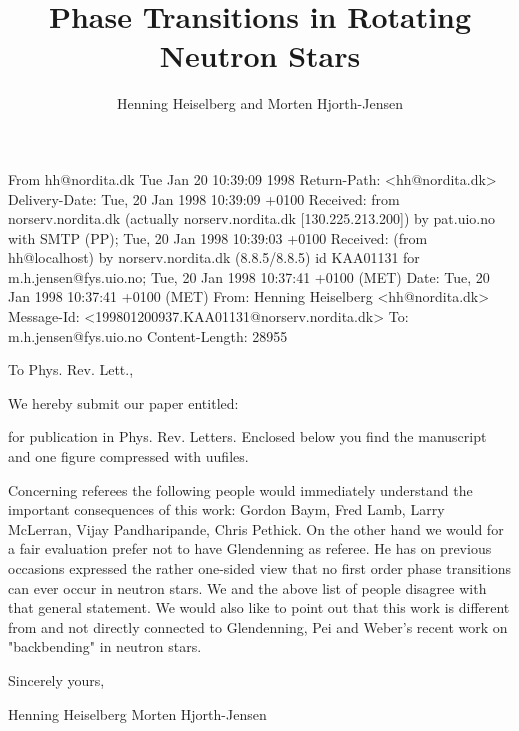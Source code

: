 From hh@nordita.dk Tue Jan 20 10:39:09 1998
Return-Path: <hh@nordita.dk>
Delivery-Date: Tue, 20 Jan 1998 10:39:09 +0100
Received: from norserv.nordita.dk (actually norserv.nordita.dk [130.225.213.200]) 
          by pat.uio.no with SMTP (PP); Tue, 20 Jan 1998 10:39:03 +0100
Received: (from hh@localhost) by norserv.nordita.dk (8.8.5/8.8.5) id KAA01131 
          for m.h.jensen@fys.uio.no; Tue, 20 Jan 1998 10:37:41 +0100 (MET)
Date: Tue, 20 Jan 1998 10:37:41 +0100 (MET)
From: Henning Heiselberg <hh@nordita.dk>
Message-Id: <199801200937.KAA01131@norserv.nordita.dk>
To: m.h.jensen@fys.uio.no
Content-Length: 28955

 To Phys. Rev. Lett.,

 We hereby submit our paper entitled:

\title{Phase Transitions in Rotating Neutron Stars}
\author{Henning Heiselberg and Morten Hjorth-Jensen}
\address{NORDITA, Blegdamsvej 17, DK-2100 Copenhagen \O, Denmark}

for publication in Phys. Rev. Letters. Enclosed below you find the
manuscript and one figure compressed with uufiles.  

 Concerning referees the following people would immediately understand
the important consequences of this work: Gordon Baym, Fred Lamb, Larry
McLerran, Vijay Pandharipande, Chris Pethick. On the other hand we
would for a fair evaluation prefer not to have Glendenning as referee.
He has on previous occasions expressed the rather one-sided view that
no first order phase transitions can ever occur in neutron stars. We
and the above list of people disagree with that general statement. We
would also like to point out that this work is different from and not
directly connected to Glendenning, Pei and Weber's recent work on
"backbending" in neutron stars.

 Sincerely yours,

 Henning Heiselberg
 Morten Hjorth-Jensen





